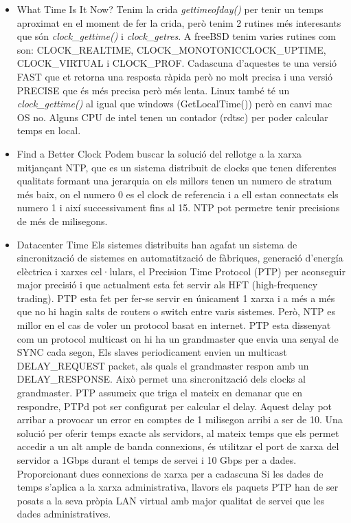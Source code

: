 \documentclass[a4paper, 10pt]{article}
\begin{document}
\begin{itemize}
    \item What Time Is It Now? \newline 
    Tenim la crida \textit{gettimeofday()} per tenir un temps aproximat en el moment de fer la crida, però tenim 2 rutines més interesants que són \textit{clock\_gettime()} i \textit{clock\_getres}. A freeBSD tenim varies rutines com son: CLOCK\_REALTIME, CLOCK\_MONOTONICCLOCK\_UPTIME, CLOCK\_VIRTUAL i CLOCK\_PROF. Cadascuna d'aquestes te una versió FAST que et retorna una resposta ràpida però no molt precisa i una versió PRECISE que és més precisa però més lenta. Linux també té un \textit{clock\_gettime()} al igual que windows (GetLocalTime()) però en canvi mac OS no. Alguns CPU de intel tenen un contador (rdtsc) per poder calcular temps en local.
    
    \item Find a Better Clock \newline 
    Podem buscar la solució del rellotge a la xarxa mitjançant NTP, que es un sistema distribuit de clocks que tenen diferentes qualitats formant una jerarquia on els millors tenen un numero de stratum més baix, on el numero 0 es el clock de referencia i a ell estan connectats els numero 1 i així successivament fins al 15. NTP pot permetre tenir precisions de més de milisegons.
    
    \item Datacenter Time \newline
    Els sistemes distribuits han agafat un sistema de sincronització de sistemes en automatització de fàbriques, generació d'energía elèctrica i xarxes cel·lulars, el Precision Time Protocol (PTP) per aconseguir major precisió i que actualment esta fet servir als HFT (high-frequency trading). PTP esta fet per fer-se servir en únicament 1 xarxa i a més a més que no hi hagin salts de routers o switch entre varis sistemes. Però, NTP es millor en el cas de voler un protocol basat en internet. \newline
    PTP esta dissenyat com un protocol multicast on hi ha un grandmaster que envia una senyal de SYNC cada segon, Els slaves periodicament envien un multicast DELAY\_REQUEST packet, als quals el grandmaster respon amb un DELAY\_RESPONSE. Això permet una sincronització dels clocks al grandmaster. PTP assumeix que triga el mateix en demanar que en respondre, PTPd pot ser configurat per calcular el delay. Aquest delay pot arribar a provocar un error en comptes de 1 milisegon arribi a ser de 10.
    Una solució per oferir temps exacte als servidors, al mateix temps que els permet accedir a un alt ample de banda
    connexions, és utilitzar el port de xarxa del servidor a 1Gbps durant el temps de servei i 10 Gbps per a dades. Proporcionant dues connexions de xarxa per a cadascuna
    Si les dades de temps s'aplica a la xarxa administrativa, llavors els paquets PTP han de ser posats a la seva pròpia LAN virtual amb major qualitat de servei que les dades administratives. 
    

\end{itemize}
\end{document}
